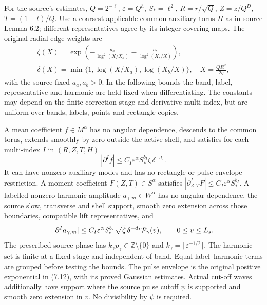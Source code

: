 \documentclass[11pt]{article}
\begin{document}
For the source's estimates, $Q=2^{-\ell}$, $\varepsilon=Q^h$,
$S_*=\ell^2$, $R=r/\sqrt Q$, $Z=z/Q^D$, $T=(1-t)/Q$.
Use a coarsest applicable common auxiliary torus $H$ as in source
Lemma 6.2; different representatives agree by its integer covering
maps. The original radial edge weights are
\[
\begin{gathered}
 \zeta(X)=\exp\left(-\frac{a_a}{\log^2(X/X_a)}
                       -\frac{a_b}{\log^2(X_b/X)}\right),\\
 \delta(X)=\min\{1,\log(X/X_a),\log(X_b/X)\},
 \quad X=\frac{QR^2}{2q},
\end{gathered}
\]
with the source fixed $a_a,a_b>0$. In the following bounds the band,
label, representative and harmonic are held fixed when differentiating.
The constants may depend on the finite correction stage and derivative
multi-index, but are uniform over bands, labels, points and rectangle
copies.

A mean coefficient $f\in M^\alpha$ has no angular dependence, descends
to the common torus, extends smoothly by zero outside the active shell,
and satisfies for each multi-index $I$ in $(R,Z,T,H)$
\[
 |\partial^If|\le C_I\varepsilon^\alpha S_*^{b_I}
                                        \zeta\,\delta^{-d_I}.
\]
It can have nonzero auxiliary modes and has no rectangle or pulse
envelope restriction. A moment coefficient $F(Z,T)\in S^\alpha$
satisfies $|\partial_{Z,T}^IF|\le C_I\varepsilon^\alpha S_*^{b_I}$.
A labelled nonzero harmonic amplitude $a_{\gamma,m}\in W^\alpha$
has no angular dependence, the source slow, transverse and shell
support, smooth zero extension across those boundaries, compatible
lift representatives, and
\[
 |\partial^Ia_{\gamma,m}|\le
 C_I\varepsilon^\alpha S_*^{b_I}\sqrt\zeta\,\delta^{-d_I}
                          {\cal P}_\gamma(v),\qquad 0\le v\le L_s.
\]
The prescribed source phase has $k_\gamma p_\gamma\in
\mathbb Z\setminus\{0\}$ and $k_\gamma=\lceil\varepsilon^{-1/2}\rceil$.
The harmonic set is finite at a fixed stage and independent of band.
Equal label--harmonic terms are grouped before testing the bounds.
The pulse envelope is the original positive exponential in (7.12),
with its proved Gaussian estimates. Actual cut-off waves additionally
have support where the source pulse cutoff $\psi$ is supported and
smooth zero extension in $v$. No divisibility by $\psi$ is required.
\end{document}
